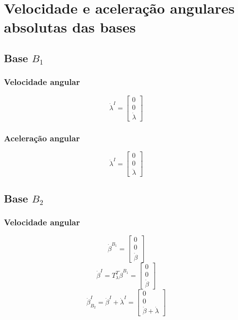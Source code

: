 \documentclass[a4paper, 12pt]{article}
\begin{document}
\section{Velocidade e aceleração angulares absolutas das bases}
	\subsection{Base $B_1$}
	\subsubsection{Velocidade angular}
		\begin{equation}
			\dot{\lambda}^I = \begin{bmatrix}
			0\\0\\ \dot{\lambda}
			\end{bmatrix}
		\end{equation}
	\subsubsection{Aceleração angular}
		\begin{equation}
			\ddot{\lambda}^I = \begin{bmatrix}
			0\\0\\ \ddot{\lambda}
			\end{bmatrix}
		\end{equation}
		
	\subsection{Base $B_2$}
	\subsubsection{Velocidade angular}
		\begin{equation}
			\dot{\beta}^{B_1} = \begin{bmatrix}
			0\\0\\ \dot{\beta}
			\end{bmatrix}
		\end{equation}
		\begin{equation}
			\dot{\beta}^{I} = T^T_{\lambda} \dot{\beta}^{B_1} = \begin{bmatrix}
			0\\0\\ \dot{\beta}
			\end{bmatrix}
		\end{equation}
		\begin{equation}
			\dot{\beta}^{I}_{B_2}= \dot{\beta}^{I} + \dot{\lambda}^{I} = \begin{bmatrix}
			0\\0\\ \dot{\beta} + \dot{\lambda}
			\end{bmatrix}
		\end{equation}
\end{document}
